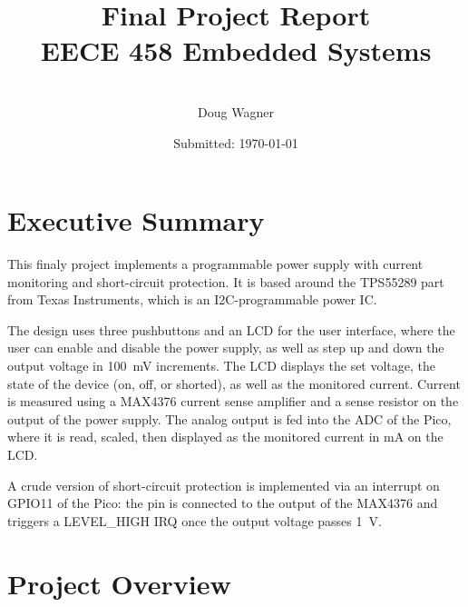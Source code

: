 \documentclass[12pt]{article}
\title{Final Project Report \\ EECE 458 Embedded Systems}
\author{\\ Doug Wagner}
\date{Submitted: \today }
\numberwithin{figure}{section}
\numberwithin{equation}{section}
\begin{document}
\maketitle 
\newpage

\tableofcontents 
\newpage 

\section{Executive Summary}

This finaly project implements a programmable power supply with current monitoring and short-circuit protection.  It is based around the TPS55289 part from Texas Instruments, which is an I2C-programmable power IC.  

The design uses three pushbuttons and an LCD for the user interface, where the user can enable and disable the power supply, as well as step up and down the output voltage in \SI{100}{\milli\volt} increments.  The LCD displays the set voltage, the state of the device (on, off, or shorted), as well as the monitored current. Current is measured using a MAX4376 current sense amplifier and a sense resistor on the output of the power supply. The analog output is fed into the ADC of the Pico, where it is read, scaled, then displayed as the monitored current in \si{\milli\ampere} on the LCD.

A crude version of short-circuit protection is implemented via an interrupt on GPIO11 of the Pico: the pin is connected to the output of the MAX4376 and triggers a LEVEL_HIGH IRQ once the output voltage passes \SI{1}{\volt}.

\section{Project Overview} 
\end{document}
